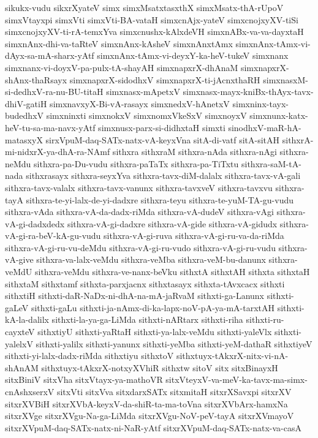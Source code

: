 {sikukx-vudu
sikxrXyateV
simx
simxMsatxtasxthX
simxMsatx-thA-rUpoV
simxVtayxpi
simxVti
simxVti-BA-vataH
simxcnAjx-yateV
simxcnojxyXV-tiSi
simxcnojxyXV-ti-rA-temxYva
simxcnushx-kAlxdeVH
simxnABx-va-va-dayxtaH
simxnAnx-dhi-va-taRteV
simxnAnx-kAsheV
simxnAnxtAmx
simxnAnx-tAmx-vi-dAyx-sa-mA-sharx-yAtf
simxnAnx-tAmx-vi-deyxY-ka-heV-tukeV
simxnanx
simxnanx-vi-doyxV-pa-pulx-tA-shayAH
simxnapxrX-dhAnaM
simxnapxrX-shAnx-thaRsayx
simxnapxrX-sidodhxV
simxnapxrX-ti-jAcnxthaRH
simxnasxM-si-dedhxV-ra-nu-BU-titaH
simxnasx-mApetxV
simxnasx-mayx-kniBx-thAyx-tavx-dhiV-gatiH
simxnavxyX-Bi-vA-rasayx
simxnedxV-hAnetxV
simxninx-tayx-budedhxV
simxninxti
simxnokxV
simxnomxVkeSxV
simxnoyxV
simxnunx-katx-heV-tu-sa-ma-navx-yAtf
simxnusx-parx-si-didhxtaH
simxti
sinodhxV-maR-hA-matasxyX
sirxVpuM-daq-SATx-natx-vA-keyxVna
sitA-di-vatf
sitA-sitAH
sithxrA-mi-nidxrX-ya-dhA-ra-NAmf
sithxra
sithxraM
sithxra-nAda
sithxra-nAgi
sithxra-neMdu
sithxra-pa-Du-vudu
sithxra-paTaTx
sithxra-pa-TiTxtu
sithxra-saM-tA-nada
sithxrasayx
sithxra-seyxYva
sithxra-tavx-diM-dalalx
sithxra-tavx-vA-gali
sithxra-tavx-valalx
sithxra-tavx-vanunx
sithxra-tavxveV
sithxra-tavxvu
sithxra-tayA
sithxra-te-yi-lalx-de-yi-dadxre
sithxra-teyu
sithxra-te-yuM-TA-gu-vudu
sithxra-vAda
sithxra-vA-da-dadx-riMda
sithxra-vA-dudeV
sithxra-vAgi
sithxra-vA-gi-dadxdedx
sithxra-vA-gi-dadxre
sithxra-vA-gide
sithxra-vA-gidudx
sithxra-vA-gi-ra-beV-kA-gu-vudu
sithxra-vA-gi-ruva
sithxra-vA-gi-ru-va-da-riMda
sithxra-vA-gi-ru-vu-deMdu
sithxra-vA-gi-ru-vudo
sithxra-vA-gi-ru-vudu
sithxra-vA-give
sithxra-va-lalx-veMdu
sithxra-veMba
sithxra-veM-bu-danunx
sithxra-veMdU
sithxra-veMdu
sithxra-ve-nanx-beVku
sithxtA
sithxtAH
sithxta
sithxtaH
sithxtaM
sithxtamf
sithxta-parxjacnx
sithxtasayx
sithxta-tAvxcacx
sithxti
sithxtiH
sithxti-daR-NaDx-ni-dhA-na-mA-jaRvaM
sithxti-ga-Lanunx
sithxti-gaLeV
sithxti-gaLu
sithxti-ja-nAmx-di-ka-lapx-noV-pA-ya-mA-tarxtAH
sithxti-kA-la-dalilx
sithxti-la-ya-ga-LiMda
sithxti-nARtarx
sithxti-riha
sithxti-ru-cayxteV
sithxtiyU
sithxti-yaRtaH
sithxti-ya-lalx-veMdu
sithxti-yaleVlx
sithxti-yalelxV
sithxti-yalilx
sithxti-yanunx
sithxti-yeMba
sithxti-yeM-dathaR
sithxtiyeV
sithxti-yi-lalx-dadx-riMda
sithxtiyu
sithxtoV
sithxtuyx-tAkxrX-nitx-vi-nA-shAnAM
sithxtuyx-tAkxrX-notxyXVhiR
sithxtw
sitoV
sitx
sitxBinayxH
sitxBiniV
sitxVha
sitxVtayx-ya-mathoVR
sitxVteyxV-va-meV-ka-tavx-ma-simx-cnAshxserxV
sitxVti
sitxVva
sitxdarxSATx
sitxmitaH
sitxrXSavxpi
sitxrXV
sitxrXVBiH
sitxrXVbA-keyxV-da-shiR-ta-ma-toVna
sitxrXVbArx-hamxNa
sitxrXVge
sitxrXVgu-Na-ga-LiMda
sitxrXVgu-NoV-peV-tayA
sitxrXVmayoV
sitxrXVpuM-daq-SATx-natx-ni-NaR-yAtf
sitxrXVpuM-daq-SATx-natx-va-casA
}
